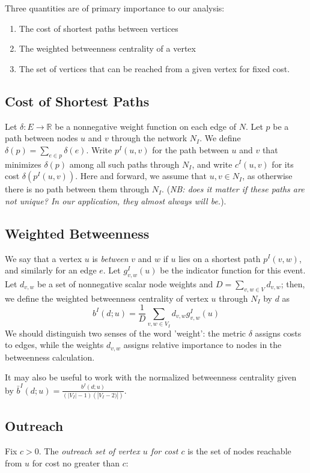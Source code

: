 \documentclass[english]{scrartcl}
\newcommand\abs[1]{\left|#1\right|}
\newcommand\R[0]{\mathbb{R}}
\begin{document}
	Three quantities are of primary importance to our analysis:
	\begin{enumerate}
		\item The cost of shortest paths between vertices
		\item The weighted betweenness centrality of a vertex
		\item The set of vertices that can be reached from a given vertex for fixed cost. 
	\end{enumerate}

	\subsection{Cost of Shortest Paths}

		Let $\delta:E\rightarrow \R$ be a nonnegative weight function on each edge of $N$. Let $p$ be a path between nodes $u$ and $v$ through the network $N_I$. We define $\delta(p) = \sum_{e \in p} \delta(e)$. Write $p^{I}(u,v)$ for the path between $u$ and $v$ that minimizes $\delta(p)$ among all such paths through $N_I$, and write $c^{I}(u,v)$ for its cost $\delta(p^{I}(u,v))$. Here and forward, we assume that $u,v \in N_I$, as otherwise there is no path between them through $N_I$. (\emph{NB: does it matter if these paths are not unique? In our application, they almost always will be.}). 

	\subsection{Weighted Betweenness}
		We say that a vertex $u$ is \emph{between} $v$ and $w$ if $u$ lies on a shortest path $p^{I}(v,w)$, and similarly for an edge $e$. Let $g^{I}_{v,w}(u)$  be the indicator function for this event. Let $d_{v,w}$ be a set of nonnegative scalar node weights and $D = \sum_{v,w \in V} d_{v,w}$; then, we define the weighted betweenness centrality of vertex $u$ through $N_I$ by $d$ as 
		\begin{equation}
			b^{I}(d;u) =   \frac{1}{D} \sum_{v,w \in V_I} d_{v,w}g^{I}_{v,w}(u)
		\end{equation} 
		We should distinguish two senses of the word 'weight': the metric $\delta$ assigns costs to edges, while the weights $d_{v,w}$ assigns relative importance to nodes in the betweenness calculation. 

		It may also be useful to work with the normalized betweenness centrality given by $\bar{b}^{I}(d;u) = \frac{b^{I}(d;u)}{(\abs{V_I} - 1)(\abs{V_I - 2)})}$.
	\subsection{Outreach}
		Fix $c > 0$. The \emph{outreach set of vertex $u$ for cost $c$} is the set of nodes reachable from $u$ for cost no greater than $c$:
\end{document}
